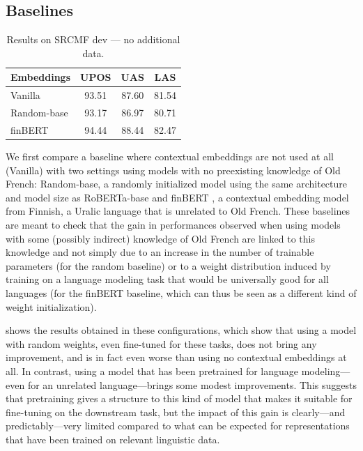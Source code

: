 \subsection{Baselines}\label{sec|baselines}
\begin{table}[thb]
    \centering
    \tablefontsize
    \begin{tabular}{l*{3}{S[table-format=2.2]}}
        \toprule
        {\textbf{Embeddings}} & {\textbf{UPOS}} & {\textbf{UAS}} & {\textbf{LAS}} \\
        \midrule
        Vanilla               & 93.51           & 87.60          & 81.54          \\
        Random-base           & 93.17           & 86.97          & 80.71          \\
        finBERT               & 94.44           & 88.44          & 82.47          \\
        \bottomrule
    \end{tabular}
    \caption{Results on SRCMF dev — no additional data.}\label{tab|nodata}
\end{table}

We first compare a baseline where contextual embeddings are not used at all (Vanilla) with two settings using models with no preexisting knowledge of Old French: Random-base, a randomly initialized model using the same architecture and model size as RoBERTa-base \citep{liu-etal-2019-roberta} %
and finBERT \citep{virtanen-etal-2019-multilingual}, a contextual embedding model from Finnish, a Uralic language that is unrelated to Old French.
These baselines are meant to check that the gain in performances observed when using models with some (possibly indirect) knowledge of Old French are linked to this knowledge and not simply due to an increase in the number of trainable parameters (for the random baseline) or to a weight distribution induced by training on a language modeling task that would be universally good for all languages (for the finBERT baseline, which can thus be seen as a different kind of weight initialization).

 shows the results obtained in these configurations, which show that using a model with random weights, even fine-tuned for these tasks, does not bring any improvement, and is in fact even worse than using no contextual embeddings at all.
In contrast, using a model that has been pretrained for language modeling---even for an unrelated language---brings some modest improvements.
This suggests that pretraining gives a structure to this kind of model that makes it suitable for fine-tuning on the downstream task, but the impact of this gain is clearly---and predictably---very limited compared to what can be expected for representations that have been trained on relevant linguistic data.

